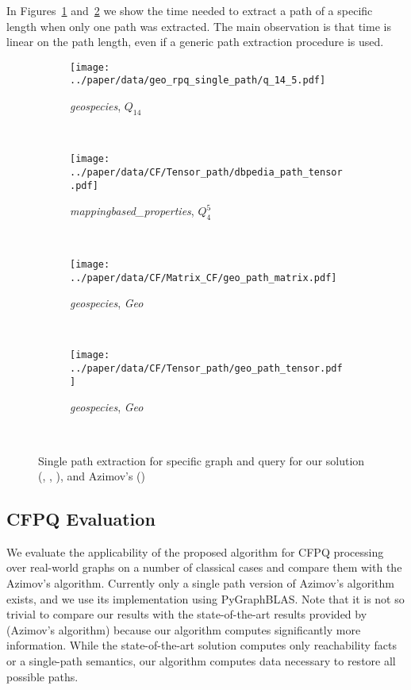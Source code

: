 In Figures~\ref{fig:geo_tensors_rpq} and~\ref{fig:dbpedia_tensors_rpq} we show the time needed to extract a path of a specific length when only one path was extracted.
The main observation is that time is linear on the path length, even if a generic path extraction procedure is used.

\begin{figure}
     \begin{subfigure}[b]{0.45\textwidth}
         \centering
         \texttt{[image: ../paper/data/geo\_rpq\_single\_path/q\_14\_5.pdf]}
         \caption{\footnotesize \textit{geospecies}, $Q_{14}$}
         \label{fig:geo_tensors_rpq}
     \end{subfigure}
     ~\begin{subfigure}[b]{0.45\textwidth}
         \centering
         \texttt{[image: ../paper/data/CF/Tensor\_path/dbpedia\_path\_tensor.pdf]}
         \caption{\footnotesize \textit{mappingbased\_properties}, $Q_{4}^5$}
         \label{fig:dbpedia_tensors_rpq}
     \end{subfigure}\\
     \begin{subfigure}[b]{0.45\textwidth}
         \centering
         \texttt{[image: ../paper/data/CF/Matrix\_CF/geo\_path\_matrix.pdf]}
         \caption{\footnotesize \textit{geospecies}, \textit{Geo}}
         \label{fig:geo_matrix_cfpq}
     \end{subfigure}
     ~\begin{subfigure}[b]{0.45\textwidth}
         \centering
         \texttt{[image: ../paper/data/CF/Tensor\_path/geo\_path\_tensor.pdf]}
         \caption{\footnotesize \textit{geospecies}, \textit{Geo}}
         \label{fig:geo_tensors_cfpq}
     \end{subfigure}\\
   \caption{Single path extraction for specific graph and query for our solution (, , ), and Azimov's ()}
\end{figure}

\subsection{CFPQ Evaluation}

We evaluate the applicability of the proposed algorithm for CFPQ processing over real-world graphs on a number of classical cases and compare them with the Azimov's algorithm.
Currently only a single path version of Azimov's algorithm exists, and we use its implementation using PyGraphBLAS. Note that it is not so trivial to compare our results with the state-of-the-art results provided by~\cite{10.1145/3398682.3399163} (Azimov's algorithm) because our algorithm computes significantly more information. While the state-of-the-art solution computes only reachability facts or a single-path semantics, our algorithm computes data necessary to restore all possible paths. 

